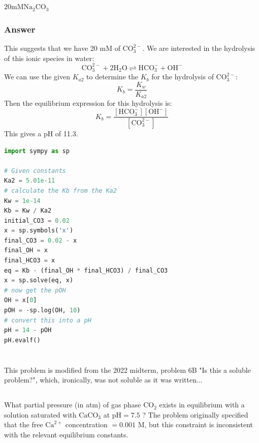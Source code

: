\documentclass[12pt]{article}
\begin{document}
\subsection{}
$20 \mathrm{mM} \mathrm{Na}_{2} \mathrm{CO}_{3}$
\subsubsection{Answer}
This suggests that we have 20 mM of $\mathrm{CO}_{3}^{2-}$. We are interested in the hydrolysis of this ionic species in water:
\begin{equation}
\mathrm{CO}_{3}^{2-}+2 \mathrm{H}_{2} \mathrm{O} \rightleftharpoons \mathrm{HCO}_{3}^{-}+\mathrm{OH}^{-}
\end{equation}
We can use the given $K_{a2}$ to determine the $K_{b}$ for the hydrolysis of $\mathrm{CO}_{3}^{2-}$:
\begin{equation}
K_{b}=\frac{K_{w}}{K_{a2}}
\end{equation}
Then the equilibrium expression for this hydrolysis is:
\begin{equation}
K_{b}=\frac{[\mathrm{HCO}_{3}^{-}][\mathrm{OH}^{-}]}{[\mathrm{CO}_{3}^{2-}]}
\end{equation}
This gives a pH of 11.3.
\begin{lstlisting}[language=Python]
import sympy as sp

# Given constants
Ka2 = 5.01e-11
# calculate the Kb from the Ka2
Kw = 1e-14
Kb = Kw / Ka2
initial_CO3 = 0.02
x = sp.symbols('x')
final_CO3 = 0.02 - x
final_OH = x
final_HCO3 = x
eq = Kb - (final_OH * final_HCO3) / final_CO3
x = sp.solve(eq, x)
# now get the pOH
OH = x[0]
pOH = -sp.log(OH, 10)
# convert this into a pH
pH = 14 - pOH
pH.evalf()
\end{lstlisting}


\section{}
This problem is modified from the 2022 midterm, problem 6B "Is this a soluble problem?", which, ironically, was not soluble as it was written...

\subsection{}
What partial pressure (in atm) of gas phase $\mathrm{CO}_{2}$ exists in equilibrium with a solution saturated with $\mathrm{CaCO}_{3}$ at $\mathrm{pH}=7.5$ ? The problem originally specified that the free $\mathrm{Ca}^{2+}$ concentration $=0.001$ $\mathrm{M}$, but this constraint is inconsistent with the relevant equilibrium constants.
\end{document}
